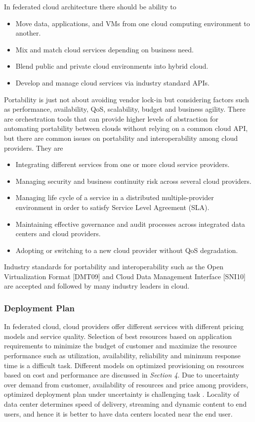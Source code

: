 \documentclass[conference]{IEEEtran}
\begin{document}
In federated cloud architecture there should be ability to 
\begin{itemize}
\item Move data, applications, and VMs from one cloud computing environment to another.
\item Mix and match cloud services depending on business need.
\item Blend public and private cloud environments into hybrid cloud.
\item Develop and manage cloud services via industry standard APIs.
\end{itemize} Portability is just not about avoiding vendor lock-in but considering factors such as performance, availability, QoS, scalability, budget and business agility.
There are orchestration tools that can provide higher levels of abstraction for automating portability between clouds without relying on a common cloud API, but there are common issues on portability and interoperability among cloud providers.
They are
\begin{itemize}
\item Integrating different services from one or more cloud service providers.
\item Managing security and business continuity risk across several cloud providers.
\item Managing life cycle of a service in a distributed multiple-provider environment in order to satisfy Service Level Agreement (SLA).
\item Maintaining effective governance and audit processes across integrated data centers and cloud providers.
\item Adopting or switching to a new cloud provider without QoS degradation.
\end{itemize}
Industry standards for portability and interoperability such as the Open Virtualization Format [DMT09] \cite{crosby2010open} and Cloud Data Management Interface [SNI10] \cite{cdmi} are accepted and followed by many industry leaders in cloud.

\subsubsection{Deployment Plan}

In federated cloud, cloud providers offer different services with different pricing models and service quality. Selection of best resources based on application requirements to minimize the budget of customer and maximize the resource performance such as utilization, availability, reliability and minimum response time is a difficult task. Different models on optimized provisioning on resources based on cost and performance are discussed in \textit{Section 4}. Due to uncertainty over demand from customer, availability of resources and price among providers, optimized deployment plan under uncertainty is challenging task \cite{buyya2010intercloud}. Locality of data center determines speed of delivery, streaming and dynamic content to end users, and hence it is better to have data centers located near the end user.
\end{document}

